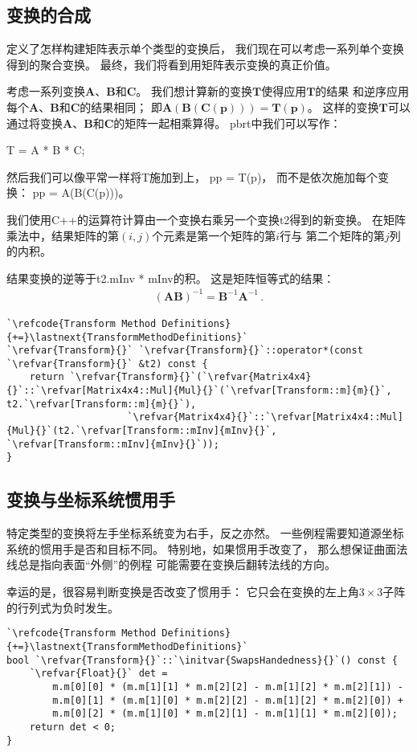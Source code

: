 \subsection{变换的合成}\label{sub:变换的合成}
定义了怎样构建矩阵表示单个类型的变换后，
我们现在可以考虑一系列单个变换得到的聚合变换。
最终，我们将看到用矩阵表示变换的真正价值。

考虑一系列变换$\bm A$、$\bm B$和$\bm C$。
我们想计算新的变换$\bm T$使得应用$\bm T$的结果
和逆序应用每个$\bm A$、$\bm B$和$\bm C$的结果相同；
即$\bm A(\bm B(\bm C(\bm p)))=\bm T(\bm p)$。
这样的变换$\bm T$可以通过将变换$\bm A$、$\bm B$和$\bm C$的矩阵一起相乘算得。
pbrt中我们可以写作：

{\ttfamily\indent {} T = A * B * C;}

然后我们可以像平常一样将{\ttfamily T}施加到上，
{\ttfamily{} pp = T(p)}，
而不是依次施加每个变换：{\ttfamily{} pp = A(B(C(p)))}。

我们使用C++的{\ttfamily *}运算符计算由一个变换右乘另一个变换{\ttfamily t2}得到的新变换。
在矩阵乘法中，结果矩阵的第$(i,j)$个元素是第一个矩阵的第$i$行与
第二个矩阵的第$j$列的内积。

结果变换的逆等于{\ttfamily t2.mInv * mInv}的积。
这是矩阵恒等式的结果：
\begin{align*}
    (\bm A\bm B)^{-1}=\bm B^{-1}\bm A^{-1}\, .
\end{align*}

\begin{lstlisting}
`\refcode{Transform Method Definitions}{+=}\lastnext{TransformMethodDefinitions}`
`\refvar{Transform}{}` `\refvar{Transform}{}`::operator*(const `\refvar{Transform}{}` &t2) const {
    return `\refvar{Transform}{}`(`\refvar{Matrix4x4}{}`::`\refvar[Matrix4x4::Mul]{Mul}{}`(`\refvar[Transform::m]{m}{}`, t2.`\refvar[Transform::m]{m}{}`),
                     `\refvar{Matrix4x4}{}`::`\refvar[Matrix4x4::Mul]{Mul}{}`(t2.`\refvar[Transform::mInv]{mInv}{}`, `\refvar[Transform::mInv]{mInv}{}`));
}
\end{lstlisting}

\subsection{变换与坐标系统惯用手}\label{sub:变换与坐标系统惯用手}
特定类型的变换将左手坐标系统变为右手，反之亦然。
一些例程需要知道源坐标系统的惯用手是否和目标不同。
特别地，如果惯用手改变了，
那么想保证曲面法线总是指向表面“外侧”的例程
可能需要在变换后翻转法线的方向。

幸运的是，很容易判断变换是否改变了惯用手：
它只会在变换的左上角$3\times3$子阵的行列式为负时发生。
\begin{lstlisting}
`\refcode{Transform Method Definitions}{+=}\lastnext{TransformMethodDefinitions}`
bool `\refvar{Transform}{}`::`\initvar{SwapsHandedness}{}`() const {
    `\refvar{Float}{}` det = 
        m.m[0][0] * (m.m[1][1] * m.m[2][2] - m.m[1][2] * m.m[2][1]) -
        m.m[0][1] * (m.m[1][0] * m.m[2][2] - m.m[1][2] * m.m[2][0]) +
        m.m[0][2] * (m.m[1][0] * m.m[2][1] - m.m[1][1] * m.m[2][0]);
    return det < 0;
}
\end{lstlisting}